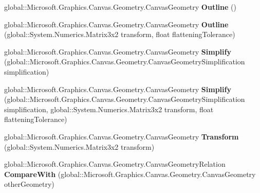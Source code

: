 \begin{DoxyCompactItemize}
global\+::\+Microsoft.\+Graphics.\+Canvas.\+Geometry.\+Canvas\+Geometry {\bfseries Outline} ()
\item 
\mbox{\label{class_microsoft_1_1_graphics_1_1_canvas_1_1_geometry_1_1_canvas_geometry_adcb0f78086d81ae4f562717eb38c2207}} 
global\+::\+Microsoft.\+Graphics.\+Canvas.\+Geometry.\+Canvas\+Geometry {\bfseries Outline} (global\+::\+System.\+Numerics.\+Matrix3x2 transform, float flattening\+Tolerance)
\item 
\mbox{\label{class_microsoft_1_1_graphics_1_1_canvas_1_1_geometry_1_1_canvas_geometry_a6b1ed02a2f08b0b00376d6eaca06738f}} 
global\+::\+Microsoft.\+Graphics.\+Canvas.\+Geometry.\+Canvas\+Geometry {\bfseries Simplify} (global\+::\+Microsoft.\+Graphics.\+Canvas.\+Geometry.\+Canvas\+Geometry\+Simplification simplification)
\item 
\mbox{\label{class_microsoft_1_1_graphics_1_1_canvas_1_1_geometry_1_1_canvas_geometry_a75548d17512c7e4839b879a019ea52f2}} 
global\+::\+Microsoft.\+Graphics.\+Canvas.\+Geometry.\+Canvas\+Geometry {\bfseries Simplify} (global\+::\+Microsoft.\+Graphics.\+Canvas.\+Geometry.\+Canvas\+Geometry\+Simplification simplification, global\+::\+System.\+Numerics.\+Matrix3x2 transform, float flattening\+Tolerance)
\item 
\mbox{\label{class_microsoft_1_1_graphics_1_1_canvas_1_1_geometry_1_1_canvas_geometry_a294f720439af95f7c721bc3c6c501e66}} 
global\+::\+Microsoft.\+Graphics.\+Canvas.\+Geometry.\+Canvas\+Geometry {\bfseries Transform} (global\+::\+System.\+Numerics.\+Matrix3x2 transform)
\item 
\mbox{\label{class_microsoft_1_1_graphics_1_1_canvas_1_1_geometry_1_1_canvas_geometry_a4af4b0665650464ff178a62d44d41cd9}} 
global\+::\+Microsoft.\+Graphics.\+Canvas.\+Geometry.\+Canvas\+Geometry\+Relation {\bfseries Compare\+With} (global\+::\+Microsoft.\+Graphics.\+Canvas.\+Geometry.\+Canvas\+Geometry other\+Geometry)
\item 
\mbox{\label{class_microsoft_1_1_graphics_1_1_canvas_1_1_geometry_1_1_canvas_geometry_a46984a998579f41371f806face56cd8a}} 

\end{DoxyCompactItemize}
